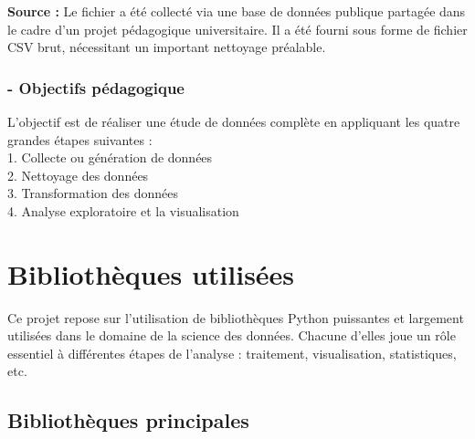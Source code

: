 \documentclass[12pt]{report}
\begin{document}
\textbf{Source :} Le fichier a été collecté via une base de données publique partagée dans le cadre d’un projet pédagogique universitaire. Il a été fourni sous forme de fichier CSV brut, nécessitant un important nettoyage préalable.




\subsection*{- Objectifs pédagogique }
L’objectif est de réaliser une étude de données complète en appliquant les quatre grandes 
étapes suivantes : \\
1. Collecte ou génération de données \\
2. Nettoyage  des données \\
3. Transformation  des données \\
4. Analyse exploratoire et la visualisation \\

\newpage
\chapter{Bibliothèques utilisées}

Ce projet repose sur l’utilisation de bibliothèques Python puissantes et largement utilisées dans le domaine de la science des données. Chacune d’elles joue un rôle essentiel à différentes étapes de l’analyse : traitement, visualisation, statistiques, etc.

\section*{Bibliothèques principales}
\end{document}
